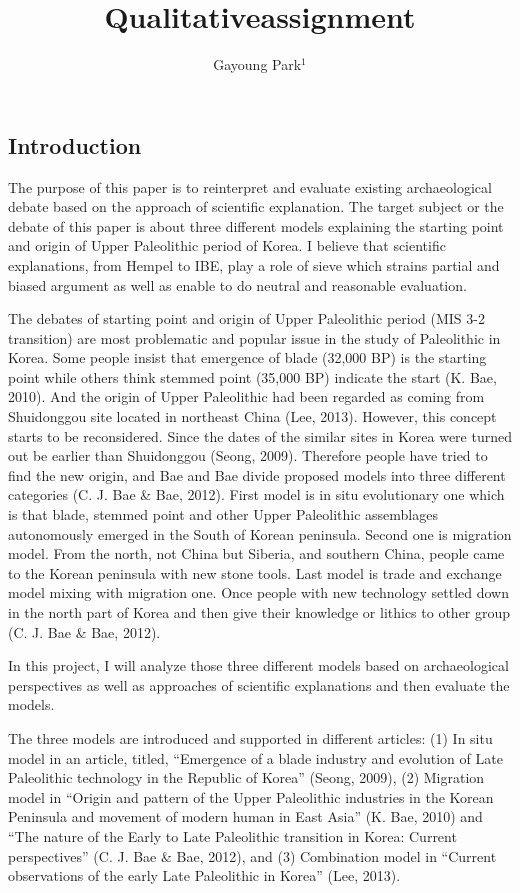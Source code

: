 \documentclass[american,man]{apa6}
\title{Qualitativeassignment}
\author{Gayoung Park\(^1\)}
\affiliation{\vspace{0.5cm}\(^1\)University of Washington}
\begin{document}
\maketitle

\subsection{Introduction}\label{introduction}

The purpose of this paper is to reinterpret and evaluate existing
archaeological debate based on the approach of scientific explanation.
The target subject or the debate of this paper is about three different
models explaining the starting point and origin of Upper Paleolithic
period of Korea. I believe that scientific explanations, from Hempel to
IBE, play a role of sieve which strains partial and biased argument as
well as enable to do neutral and reasonable evaluation.

The debates of starting point and origin of Upper Paleolithic period
(MIS 3-2 transition) are most problematic and popular issue in the study
of Paleolithic in Korea. Some people insist that emergence of blade
(32,000 BP) is the starting point while others think stemmed point
(35,000 BP) indicate the start (K. Bae, 2010). And the origin of Upper
Paleolithic had been regarded as coming from Shuidonggou site located in
northeast China (Lee, 2013). However, this concept starts to be
reconsidered. Since the dates of the similar sites in Korea were turned
out be earlier than Shuidonggou (Seong, 2009). Therefore people have
tried to find the new origin, and Bae and Bae divide proposed models
into three different categories (C. J. Bae \& Bae, 2012). First model is
in situ evolutionary one which is that blade, stemmed point and other
Upper Paleolithic assemblages autonomously emerged in the South of
Korean peninsula. Second one is migration model. From the north, not
China but Siberia, and southern China, people came to the Korean
peninsula with new stone tools. Last model is trade and exchange model
mixing with migration one. Once people with new technology settled down
in the north part of Korea and then give their knowledge or lithics to
other group (C. J. Bae \& Bae, 2012).

In this project, I will analyze those three different models based on
archaeological perspectives as well as approaches of scientific
explanations and then evaluate the models.

The three models are introduced and supported in different articles: (1)
In situ model in an article, titled, \enquote{Emergence of a blade
industry and evolution of Late Paleolithic technology in the Republic of
Korea} (Seong, 2009), (2) Migration model in \enquote{Origin and pattern
of the Upper Paleolithic industries in the Korean Peninsula and movement
of modern human in East Asia} (K. Bae, 2010) and \enquote{The nature of
the Early to Late Paleolithic transition in Korea: Current perspectives}
(C. J. Bae \& Bae, 2012), and (3) Combination model in \enquote{Current
observations of the early Late Paleolithic in Korea} (Lee, 2013).
\end{document}
